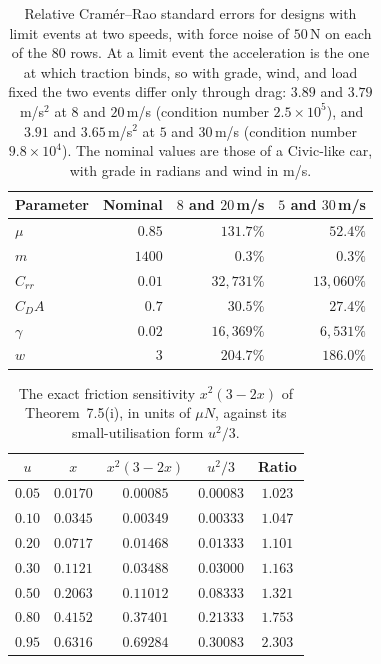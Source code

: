 \documentclass[12pt, twoside]{amsart}
\theoremstyle{definition}
\newcommand{\mainref}[2]{#2}
\begin{document}
\begin{table}[htbp]
\centering\small
\caption{Relative Cram\'er--Rao standard errors for designs with limit events at two speeds, with force noise of $50$\,N on each of the $80$ rows. At a limit event the acceleration is the one at which traction binds, so with grade, wind, and load fixed the two events differ only through drag: $3.89$ and $3.79$\,m/s$^2$ at $8$ and $20$\,m/s (condition number $2.5\times10^{5}$), and $3.91$ and $3.65$\,m/s$^2$ at $5$ and $30$\,m/s (condition number $9.8\times10^{4}$). The nominal values are those of a Civic-like car, with grade in radians and wind in m/s.}\label{tab:app-crb}
\begin{tabular}{lrrr}
\toprule
Parameter & Nominal & $8$ and $20$\,m/s & $5$ and $30$\,m/s\\
\midrule
$\mu$ & $0.85$ & $131.7\%$ & $52.4\%$\\
$m$ & $1400$ & $0.3\%$ & $0.3\%$\\
$C_{rr}$ & $0.01$ & $32{,}731\%$ & $13{,}060\%$\\
$C_DA$ & $0.7$ & $30.5\%$ & $27.4\%$\\
$\gamma$ & $0.02$ & $16{,}369\%$ & $6{,}531\%$\\
$w$ & $3$ & $204.7\%$ & $186.0\%$\\
\bottomrule
\end{tabular}
\end{table}
\begin{table}[htbp]
\centering\small
\caption{The exact friction sensitivity $x^2(3-2x)$ of Theorem~\mainref{thm:info}{7.5}\mainref{in:sens}{{(i)}}, in units of $\mu N$, against its small-utilisation form $u^2/3$.}\label{tab:app-sens}
\begin{tabular}{ccccc}
\toprule
$u$ & $x$ & $x^2(3-2x)$ & $u^2/3$ & Ratio\\
\midrule
$0.05$ & $0.0170$ & $0.00085$ & $0.00083$ & $1.023$\\
$0.10$ & $0.0345$ & $0.00349$ & $0.00333$ & $1.047$\\
$0.20$ & $0.0717$ & $0.01468$ & $0.01333$ & $1.101$\\
$0.30$ & $0.1121$ & $0.03488$ & $0.03000$ & $1.163$\\
$0.50$ & $0.2063$ & $0.11012$ & $0.08333$ & $1.321$\\
$0.80$ & $0.4152$ & $0.37401$ & $0.21333$ & $1.753$\\
$0.95$ & $0.6316$ & $0.69284$ & $0.30083$ & $2.303$\\
\bottomrule
\end{tabular}
\end{table}
\end{document}
